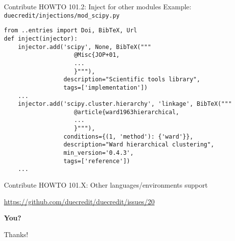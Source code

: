 \documentclass[]{beamer}
\begin{document}
\begin{frame}[fragile]{Contribute HOWTO 101.2: Inject for other modules}
Example: \texttt{duecredit/injections/mod\_scipy.py}

\begin{verbatim}
from ..entries import Doi, BibTeX, Url
def inject(injector):
    injector.add('scipy', None, BibTeX("""
                    @Misc{JOP+01,
                    ...
                    }"""),
                 description="Scientific tools library",
                 tags=['implementation'])
    ...
    injector.add('scipy.cluster.hierarchy', 'linkage', BibTeX("""
                    @article{ward1963hierarchical,
                    ...
                    }"""),
                 conditions={(1, 'method'): {'ward'}},
                 description="Ward hierarchical clustering",
                 min_version='0.4.3',
                 tags=['reference'])
    ...
\end{verbatim}

\end{frame}

\begin{frame}{Contribute HOWTO 101.X: Other languages/environments support}
  \begin{description}[XXXX]
  \item[Matlab/Octave]
    \url{https://github.com/duecredit/duecredit/issues/20}
  \item[R, C/C++, ...] \textbf{You?}
  \end{description}
\end{frame}


\begin{frame}{}
\begin{center}
\Large Thanks!
\end{center}
\end{frame}
\end{document}
